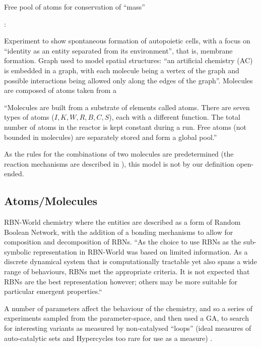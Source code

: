 Free pool of atoms for conservation of ``mass''

\parencite{Fenizio2001}:

Experiment to show spontaneous formation of autopoietic cells, with a focus on ``identity as an entity separated from its environment'', that is, membrane formation. Graph used to model spatial structures: ``an artificial chemistry (AC) is embedded in a graph, with each molecule being a vertex of the graph and possible interactions being allowed only along the edges of the graph''. Molecules are composed of atoms taken from a 

``Molecules are built from a substrate of elements called atoms. There are seven types of atoms ($I, K, W, R, B, C, S$), each with a different function. The total number of atoms in the reactor is kept constant during a run. Free atoms (not bounded in molecules) are separately stored and form a global pool.''

As the rules for the combinations of two molecules are predetermined (the reaction mechanisms are described in \cite{Fenizio2000}), this model is not by our definition open-ended.

\subsection{Atoms/Molecules}

RBN-World \cite{Faulconbridge2011} chemistry where the entities are described as a form of Random Boolean Network, with the addition of a bonding mechanisms to allow for composition and decomposition of RBNs. ``As the choice to use RBNs as the sub-symbolic representation in RBN-World was based on limited information. As a discrete dynamical system that is computationally tractable yet also spans a wide range of behaviours, RBNs met the appropriate criteria. It is not expected that RBNs are the best representation however; others may be more suitable for particular emergent properties.``

A number of parameters affect the behaviour of the chemistry, and so a series of experiments sampled from the parameter-space, and then used a GA, to search for interesting variants as measured by non-catalysed ``loops'' (ideal measures of auto-catalytic sets and Hypercycles too rare for use as a measure) \parencite[chap.8]{Faulconbridge2011}. 

